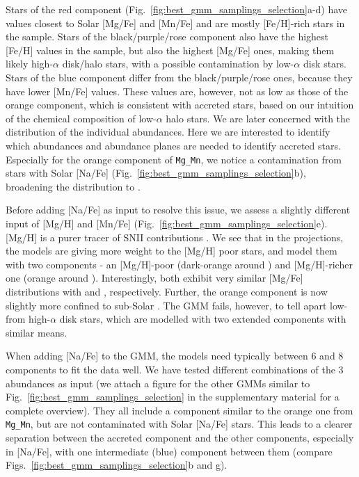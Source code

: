 \documentclass[fleqn,usenatbib]{mnras}
\begin{document}
Stars of the red component (Fig.~\ref{fig:best_gmm_samplings_selection}a-d) have values closest to Solar [Mg/Fe] and [Mn/Fe] and are mostly [Fe/H]-rich stars in the sample. Stars of the black/purple/rose component also have the highest [Fe/H] values in the sample, but also the highest [Mg/Fe] ones, making them likely high-$\alpha$ disk/halo stars, with a possible contamination by low-$\alpha$ disk stars. Stars of the blue component differ from the black/purple/rose ones, because they have lower [Mn/Fe] values. These values are, however, not as low as those of the orange component, which is consistent with accreted stars, based on our intuition of the chemical composition of low-$\alpha$ halo stars. We are later concerned with the distribution of the individual abundances. Here we are interested to identify which abundances and abundance planes are needed to identify accreted stars. Especially for the orange component of \texttt{Mg\_Mn}, we notice a contamination from stars with Solar [Na/Fe] (Fig.~\ref{fig:best_gmm_samplings_selection}b), broadening the distribution to .

Before adding [Na/Fe] as input to resolve this issue, we assess a slightly different input of [Mg/H] and [Mn/Fe] (Fig.~\ref{fig:best_gmm_samplings_selection}e). [Mg/H] is a purer tracer of SNII contributions \citep{Kobayashi2020, Feuillet2021}. We see that in the projections, the models are giving more weight to the [Mg/H] poor stars, and model them with two components - an [Mg/H]-poor (dark-orange around ) and [Mg/H]-richer one (orange around ). Interestingly, both exhibit very similar [Mg/Fe] distributions with  and , respectively. Further, the orange component is now slightly more confined to sub-Solar . The GMM fails, however, to tell apart low- from high-$\alpha$ disk stars, which are modelled with two extended components with similar means.

When adding [Na/Fe] to the GMM, the models need typically between 6 and 8 components to fit the data well. We have tested different combinations of the 3 abundances as input (we attach a figure for the other GMMs similar to Fig.~\ref{fig:best_gmm_samplings_selection} in the supplementary material for a complete overview). They all include a component similar to the orange one from \texttt{Mg\_Mn}, but are not contaminated with Solar [Na/Fe] stars. This leads to a clearer separation between the accreted component and the other components, especially in [Na/Fe], with one intermediate (blue) component between them (compare Figs.~\ref{fig:best_gmm_samplings_selection}b and g). 
\end{document}

